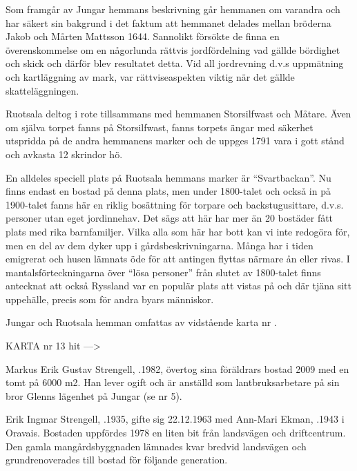 Som framgår av Jungar hemmans beskrivning går hemmanen om varandra och har säkert sin bakgrund i det faktum att hemmanet delades mellan bröderna Jakob och Mårten Mattsson 1644. Sannolikt försökte de finna en överenskommelse om en någorlunda rättvis jordfördelning vad gällde bördighet och skick och därför blev resultatet detta. Vid all jordrevning d.v.s uppmätning och kartläggning av mark, var rättviseaspekten viktig när det gällde skatteläggningen.

Ruotsala deltog i rote tillsammans med hemmanen Storsilfwast och Måtare. Även om själva torpet fanns på Storsilfwast, fanns torpets ängar med säkerhet utspridda på de andra hemmanens marker och de uppges 1791 vara i gott stånd och avkasta 12 skrindor hö.

En alldeles speciell plats på Ruotsala hemmans marker är ``Svartbackan''. Nu finns endast en bostad på denna plats, men under 1800-talet och också in på 1900-talet fanns här en riklig bosättning för torpare och backstugusittare, d.v.s. personer utan eget jordinnehav. Det sägs att här har mer än 20 bostäder fått plats med rika barnfamiljer. Vilka alla som här har bott kan vi inte redogöra för, men en del av dem dyker upp i gårdsbeskrivningarna. Många har i tiden emigrerat och husen lämnats öde för att antingen flyttas närmare ån eller rivas. I mantalsförteckningarna över ``lösa personer'' från slutet av 1800-talet finns antecknat att också Ryssland var en populär plats att vistas på och där tjäna sitt uppehälle, precis som för andra byars människor.

Jungar och Ruotsala hemman omfattas av vidstående karta nr .


KARTA nr 13 hit --->





Markus Erik Gustav Strengell, .1982, övertog sina föräldrars bostad 2009 med en tomt på 6000 m2. Han lever ogift och är anställd som lantbruksarbetare på sin bror Glenns lägenhet på Jungar (se nr 5).


Erik Ingmar Strengell, .1935, gifte sig 22.12.1963 med Ann-Mari Ekman, .1943 i Oravais. Bostaden uppfördes 1978 en liten bit från landsvägen och driftcentrum. Den gamla mangårdsbyggnaden lämnades kvar bredvid landsvägen och grundrenoverades till bostad för följande generation.



